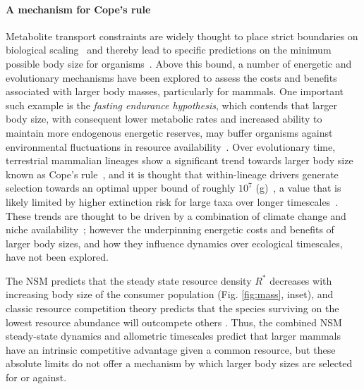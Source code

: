 \documentclass[twocolumn,preprintnumbers,amsmath,amssymb,superscriptaddress]{revtex4}
\begin{document}
\noindent \paragraph*{{\bf A mechanism for Cope's rule}} Metabolite transport constraints are widely thought to place strict boundaries on biological scaling~\citep{Brown:1993p708,West:1997cg,Brown:2004wq} and thereby lead to specific predictions on the minimum possible body size for organisms~\citep{West:2002ud}.
Above this bound, a number of energetic and evolutionary mechanisms have been explored to assess the costs and benefits associated with larger body masses, particularly for mammals.
One important such example is the \emph{fasting endurance hypothesis}, which contends that larger body size, with consequent lower metabolic rates and increased ability to maintain more endogenous energetic reserves, may buffer organisms against environmental fluctuations in resource availability~\citep{Millar:1990p923}.
Over evolutionary time, terrestrial mammalian lineages show a significant trend towards larger body size known as Cope's rule~\citep{Alroy:1998p1594,Clauset:2009fh,Smith:2010p3442,Saarinen:2014br}, and it is thought that within-lineage drivers generate selection towards an optimal upper bound of roughly $10^7$ (g)~\citep{Alroy:1998p1594}, a value that is likely limited by higher extinction risk for large taxa over longer timescales~\citep{Clauset:2009fh}.
These trends are thought to be driven by a combination of climate change and niche availability~\citep{Saarinen:2014br}; however the underpinning energetic costs and benefits of larger body sizes, and how they influence dynamics over ecological timescales, have not been explored.



The NSM predicts that the steady state resource density $R^{*}$ decreases with increasing body size of the consumer population (Fig. \ref{fig:mass}, inset), and classic resource competition theory predicts that the species surviving on the lowest resource abundance will outcompete others \citep{tilman1981,dutkiewicz2009,barton2010}. Thus, the combined NSM steady-state dynamics and allometric timescales predict that larger mammals have an intrinsic competitive advantage given a common resource, but these absolute limits do not offer a mechanism by which larger body sizes are selected for or against.
\end{document}
